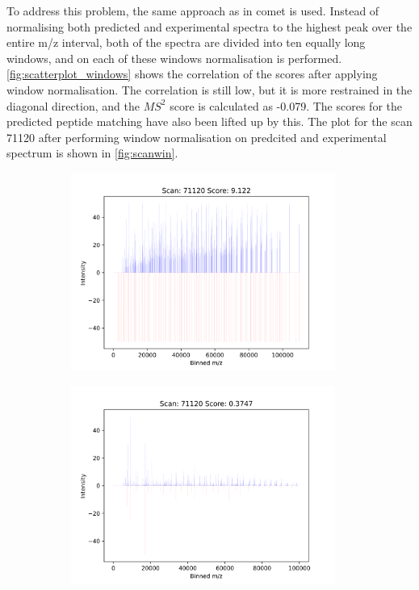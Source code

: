 \documentclass[11pt]{article}
\begin{document}
To address this problem, the same approach as in comet is used. Instead of normalising both predicted and experimental spectra to the highest peak over the entire m/z interval, both of the spectra are divided into ten equally long windows, and on each of these windows normalisation is performed. \cref{fig:scatterplot_windows} shows the correlation of the scores after applying window normalisation. The correlation is still low, but it is more restrained in the diagonal direction, and the \(MS^2\) score is calculated as -0.079. The scores for the predicted peptide matching have also been lifted up by this. The plot for the scan 71120 after performing window normalisation on predcited and experimental spectrum is shown in \cref{fig:scanwin}.

\begin{figure}
\centering
\begin{subfigure}[b]{1\textwidth}
    \includegraphics[width=0.95\textwidth]{figs/scan_71120_ps=False.png}
   \caption{}
   \label{fig:theo} 
\end{subfigure}
\begin{subfigure}[b]{1\textwidth}
   \includegraphics[width=0.95\textwidth]{figs/scan_71120_ps=True.png}
   \caption{}
   \label{fig:predict}
\end{subfigure}


\end{figure}
\end{document}
